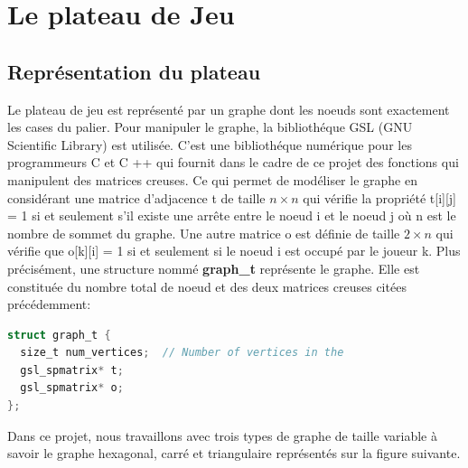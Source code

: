 \section{Le plateau de Jeu}

\subsection{Représentation du plateau}
\label{sec:plateau_de_jeu}
Le plateau de jeu est représenté par un graphe dont les noeuds sont exactement les cases du palier. Pour manipuler le graphe, la bibliothéque GSL (GNU Scientific Library) est utilisée. C'est une bibliothéque numérique pour les programmeurs C et C ++ qui fournit dans le cadre de ce projet des fonctions qui manipulent des matrices creuses. Ce qui permet de modéliser le graphe en considérant une matrice d'adjacence t de taille $n\times n $ qui vérifie la propriété t[i][j] = 1 si et seulement s'il existe une arrête entre le noeud i et le noeud j où n est le nombre de sommet du graphe. Une autre matrice o est définie de taille $2\times n$ qui vérifie que o[k][i] = 1 si et seulement si le noeud i est occupé par le joueur k.
Plus précisément, une structure nommé \textbf{graph\_t} représente le graphe. Elle est constituée du nombre total de noeud et des deux matrices creuses citées précédemment:
\begin{lstlisting}[language={C},captionpos=b, frame=single]
    struct graph_t {
  size_t num_vertices;  // Number of vertices in the 
  gsl_spmatrix* t;  
  gsl_spmatrix* o;      
};
\end{lstlisting}
Dans ce projet, nous travaillons avec trois types de graphe de taille variable à savoir le graphe hexagonal, carré et triangulaire représentés sur la figure suivante.
